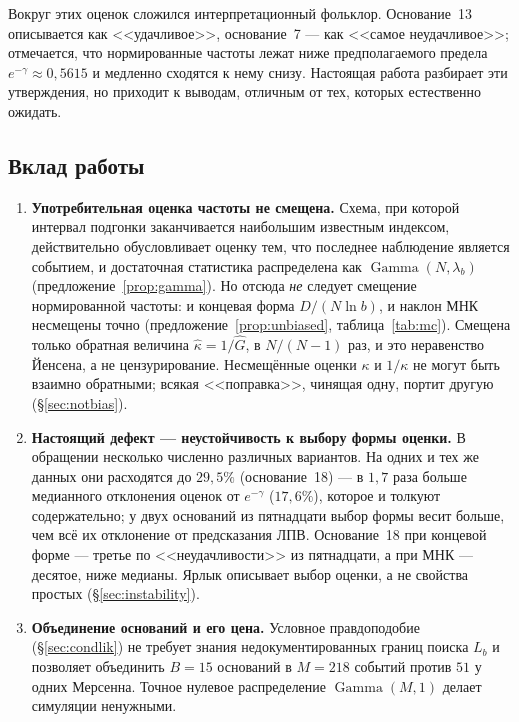 \documentclass[11pt,a4paper]{article}
\theoremstyle{plain}
\theoremstyle{remark}
\newcommand{\emg}{e^{-\gamma}}
\DeclareMathOperator{\Gam}{Gamma}
\begin{document}
Вокруг этих оценок сложился интерпретационный фольклор. Основание~13 описывается как
<<удачливое>>, основание~7 --- как <<самое неудачливое>>; отмечается, что нормированные
частоты лежат ниже предполагаемого предела $\emg\approx0{,}5615$ и медленно сходятся
к нему снизу. Настоящая работа разбирает эти утверждения, но приходит к выводам,
отличным от тех, которых естественно ожидать.

\subsection{Вклад работы}

\begin{enumerate}
\item\textbf{Употребительная оценка частоты не смещена.} Схема, при которой интервал
подгонки заканчивается наибольшим известным индексом, действительно обусловливает
оценку тем, что последнее наблюдение является событием, и достаточная статистика
распределена как $\Gam(N,\lambda_b)$ (предложение~\ref{prop:gamma}). Но отсюда
\emph{не} следует смещение нормированной частоты: и концевая форма
$D/(N\ln b)$, и наклон МНК несмещены точно (предложение~\ref{prop:unbiased},
таблица~\ref{tab:mc}). Смещена только обратная величина
$\hat\kappa=1/\hat G$, в $N/(N-1)$ раз, и это неравенство Йенсена, а не цензурирование.
Несмещённые оценки $\kappa$ и $1/\kappa$ не могут быть взаимно обратными; всякая
<<поправка>>, чинящая одну, портит другую (\S\ref{sec:notbias}).

\item\textbf{Настоящий дефект --- неустойчивость к выбору формы оценки.}
В обращении несколько численно различных вариантов. На одних и тех же данных они
расходятся до $29{,}5\%$ (основание~18) --- в $1{,}7$ раза больше медианного
отклонения оценок от $\emg$ ($17{,}6\%$), которое и толкуют содержательно; у двух
оснований из пятнадцати выбор формы весит больше, чем всё их отклонение от
предсказания ЛПВ. Основание~18 при концевой форме --- третье
по <<неудачливости>> из пятнадцати, а при МНК --- десятое, ниже медианы. Ярлык
описывает выбор оценки, а не свойства простых (\S\ref{sec:instability}).

\item\textbf{Объединение оснований и его цена.} Условное правдоподобие
(\S\ref{sec:condlik}) не требует знания недокументированных границ поиска $L_b$ и
позволяет объединить $B=15$ оснований в $M=218$ событий против $51$ у одних
Мерсенна. Точное нулевое распределение $\Gam(M,1)$ делает симуляции ненужными.


\end{enumerate}
\end{document}
